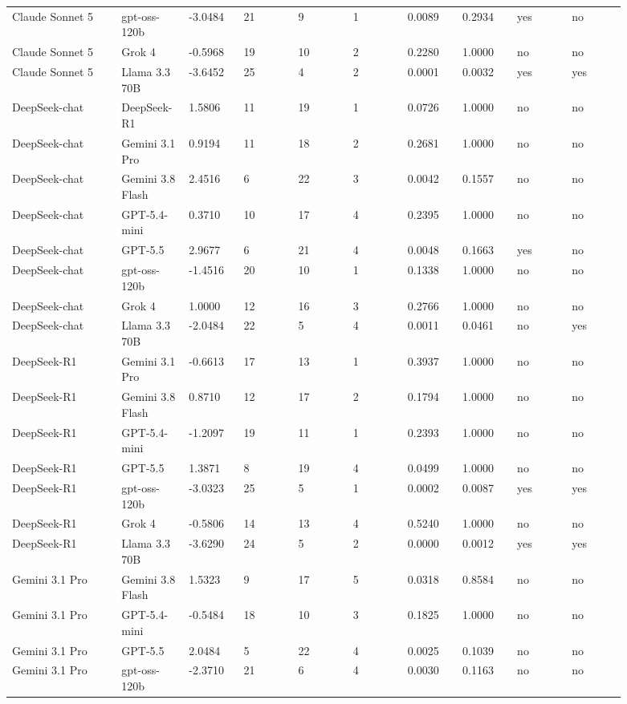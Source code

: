\begin{landscape}
\begin{longtable}{p{0.162\linewidth}p{0.081\linewidth}p{0.081\linewidth}p{0.081\linewidth}p{0.081\linewidth}p{0.081\linewidth}p{0.081\linewidth}p{0.081\linewidth}p{0.081\linewidth}p{0.081\linewidth}}
Claude Sonnet 5 & gpt-oss-120b & -3.0484 & 21 & 9 & 1 & 0.0089 & 0.2934 & yes & no \\
Claude Sonnet 5 & Grok 4 & -0.5968 & 19 & 10 & 2 & 0.2280 & 1.0000 & no & no \\
Claude Sonnet 5 & Llama 3.3 70B & -3.6452 & 25 & 4 & 2 & 0.0001 & 0.0032 & yes & yes \\
DeepSeek-chat & DeepSeek-R1 & 1.5806 & 11 & 19 & 1 & 0.0726 & 1.0000 & no & no \\
DeepSeek-chat & Gemini 3.1 Pro & 0.9194 & 11 & 18 & 2 & 0.2681 & 1.0000 & no & no \\
DeepSeek-chat & Gemini 3.8 Flash & 2.4516 & 6 & 22 & 3 & 0.0042 & 0.1557 & no & no \\
DeepSeek-chat & GPT-5.4-mini & 0.3710 & 10 & 17 & 4 & 0.2395 & 1.0000 & no & no \\
DeepSeek-chat & GPT-5.5 & 2.9677 & 6 & 21 & 4 & 0.0048 & 0.1663 & yes & no \\
DeepSeek-chat & gpt-oss-120b & -1.4516 & 20 & 10 & 1 & 0.1338 & 1.0000 & no & no \\
DeepSeek-chat & Grok 4 & 1.0000 & 12 & 16 & 3 & 0.2766 & 1.0000 & no & no \\
DeepSeek-chat & Llama 3.3 70B & -2.0484 & 22 & 5 & 4 & 0.0011 & 0.0461 & no & yes \\
DeepSeek-R1 & Gemini 3.1 Pro & -0.6613 & 17 & 13 & 1 & 0.3937 & 1.0000 & no & no \\
DeepSeek-R1 & Gemini 3.8 Flash & 0.8710 & 12 & 17 & 2 & 0.1794 & 1.0000 & no & no \\
DeepSeek-R1 & GPT-5.4-mini & -1.2097 & 19 & 11 & 1 & 0.2393 & 1.0000 & no & no \\
DeepSeek-R1 & GPT-5.5 & 1.3871 & 8 & 19 & 4 & 0.0499 & 1.0000 & no & no \\
DeepSeek-R1 & gpt-oss-120b & -3.0323 & 25 & 5 & 1 & 0.0002 & 0.0087 & yes & yes \\
DeepSeek-R1 & Grok 4 & -0.5806 & 14 & 13 & 4 & 0.5240 & 1.0000 & no & no \\
DeepSeek-R1 & Llama 3.3 70B & -3.6290 & 24 & 5 & 2 & 0.0000 & 0.0012 & yes & yes \\
Gemini 3.1 Pro & Gemini 3.8 Flash & 1.5323 & 9 & 17 & 5 & 0.0318 & 0.8584 & no & no \\
Gemini 3.1 Pro & GPT-5.4-mini & -0.5484 & 18 & 10 & 3 & 0.1825 & 1.0000 & no & no \\
Gemini 3.1 Pro & GPT-5.5 & 2.0484 & 5 & 22 & 4 & 0.0025 & 0.1039 & no & no \\
Gemini 3.1 Pro & gpt-oss-120b & -2.3710 & 21 & 6 & 4 & 0.0030 & 0.1163 & no & no \\

\end{longtable}
\end{landscape}
